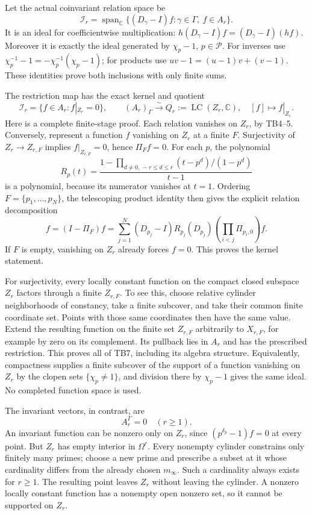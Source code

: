 Let the actual coinvariant relation space be
\[
\mathcal I_r=\operatorname{span}_{\mathbb C}
       \{(D_\gamma-I)f:\gamma\in\Gamma,\ f\in A_r\}.
\]
It is an ideal for coefficientwise multiplication:
\(h(D_\gamma-I)f=(D_\gamma-I)(hf)\).
Moreover it is exactly the ideal generated by
\(\chi_p-1\), \(p\in\mathcal P\).
For inverses use
\(\chi_p^{-1}-1=-\chi_p^{-1}(\chi_p-1)\);
for products use
\(uv-1=(u-1)v+(v-1)\).
These identities prove both inclusions with only finite sums.

The restriction map has the exact kernel and quotient
\[
\boxed{
\mathcal I_r
 =\{f\in A_r:f|_{Z_r}=0\},\qquad
(A_r)_\Gamma\xrightarrow{\sim}
 Q_r:=\operatorname{LC}(Z_r,\mathbb C),\quad [f]\mapsto f|_{Z_r}.
}
\tag{TB7}
\]
Here is a complete finite-stage proof. Each relation vanishes on
\(Z_r\), by TB4--5. Conversely, represent a function \(f\) vanishing
on \(Z_r\) at a finite \(F\). Surjectivity of
\(Z_r\to Z_{r,F}\) implies \(f|_{Z_{r,F}}=0\), hence
\(\Pi_Ff=0\).
For each \(p\), the polynomial
\[
R_p(t)=\frac{1-
 \prod_{d\ne0,\,-r\le d\le r}(t-p^d)/(1-p^d)}{t-1}
\]
is a polynomial, because its numerator vanishes at \(t=1\).
Ordering \(F=\{p_1,\ldots,p_N\}\), the telescoping product identity
then gives the explicit relation decomposition
\[
f=(I-\Pi_F)f
 =\sum_{j=1}^N(D_{p_j}-I)R_{p_j}(D_{p_j})
                \left(\prod_{i<j}\Pi_{p_i,0}\right)f.
\tag{TB8}
\]
If \(F\) is empty, vanishing on \(Z_r\) already forces \(f=0\).
This proves the kernel statement.

For surjectivity, every locally constant function on the compact
closed subspace \(Z_r\) factors through a finite \(Z_{r,F}\).
To see this, choose relative cylinder neighborhoods of constancy,
take a finite subcover, and take their common finite coordinate set.
Points with those same coordinates then have the same value.
Extend the resulting function on the finite set \(Z_{r,F}\)
arbitrarily to \(X_{r,F}\), for example by zero on its complement.
Its pullback lies in \(A_r\) and has the prescribed restriction.
This proves all of TB7, including its algebra structure.
Equivalently, compactness supplies a finite subcover of the support
of a function vanishing on \(Z_r\) by the clopen sets
\(\{\chi_p\ne1\}\), and division there by \(\chi_p-1\) gives the
same ideal. No completed function space is used.

The invariant vectors, in contrast, are
\[
\boxed{A_r^\Gamma=0\quad(r\ge1).}\tag{TB9}
\]
An invariant function can be nonzero only on \(Z_r\), since
\((p^{\delta_p}-1)f=0\) at every point. But \(Z_r\) has empty
interior in \(\Omega^r\). Every nonempty cylinder constrains only
finitely many primes; choose a new prime and prescribe a subset
at it whose cardinality differs from the already chosen
\(m_\infty\). Such a cardinality always exists for \(r\ge1\).
The resulting point leaves \(Z_r\) without leaving the cylinder.
A nonzero locally constant function has a nonempty open nonzero
set, so it cannot be supported on \(Z_r\).

